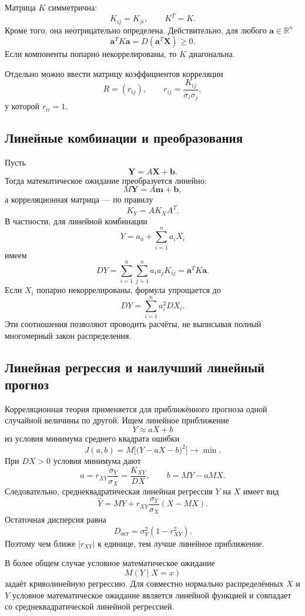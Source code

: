 Матрица $K$ симметрична:
\[
    K_{ij}=K_{ji},\qquad K^T=K.
\]
Кроме того, она неотрицательно определена. Действительно, для любого
$\mathbf a\in\mathbb R^n$
\[
    \mathbf a^T K\mathbf a
    =D(\mathbf a^T\mathbf X)\geq0.
\]
Если компоненты попарно некоррелированы, то $K$ диагональна.

Отдельно можно ввести матрицу коэффициентов корреляции
\[
    R=(r_{ij}),\qquad
    r_{ij}=\frac{K_{ij}}{\sigma_i\sigma_j},
\]
у которой $r_{ii}=1$.

\subsection{Линейные комбинации и преобразования}

Пусть
\[
    \mathbf Y=A\mathbf X+\mathbf b.
\]
Тогда математическое ожидание преобразуется линейно:
\[
    M\mathbf Y=A\mathbf m+\mathbf b,
\]
а корреляционная матрица --- по правилу
\[
    K_Y=A K_X A^T.
\]
В частности, для линейной комбинации
\[
    Y=a_0+\sum_{i=1}^n a_iX_i
\]
имеем
\[
    DY=\sum_{i=1}^n\sum_{j=1}^n a_i a_j K_{ij}
      =\mathbf a^T K\mathbf a.
\]
Если $X_i$ попарно некоррелированы, формула упрощается до
\[
    DY=\sum_{i=1}^n a_i^2 DX_i.
\]
Эти соотношения позволяют проводить расчёты, не выписывая полный многомерный
закон распределения.

\subsection{Линейная регрессия и наилучший линейный прогноз}

Корреляционная теория применяется для приближённого прогноза одной случайной
величины по другой. Ищем линейное приближение
\[
    Y\approx aX+b
\]
из условия минимума среднего квадрата ошибки
\[
    J(a,b)=M\bigl[\bigl(Y-aX-b\bigr)^2\bigr]\to\min.
\]
При $DX>0$ условия минимума дают
\[
    a=r_{XY}\frac{\sigma_Y}{\sigma_X}
      =\frac{K_{XY}}{DX},
    \qquad
    b=MY-aMX.
\]
Следовательно, среднеквадратическая линейная регрессия $Y$ на $X$ имеет вид
\[
    \widehat Y
    =MY+r_{XY}\frac{\sigma_Y}{\sigma_X}(X-MX).
\]
Остаточная дисперсия равна
\[
    D_{\text{ост}}=\sigma_Y^2(1-r_{XY}^2).
\]
Поэтому чем ближе $|r_{XY}|$ к единице, тем лучше линейное приближение.

В более общем случае условное математическое ожидание
\[
    M(Y\mid X=x)
\]
задаёт криволинейную регрессию. Для совместно нормально распределённых
$X$ и $Y$ условное математическое ожидание является линейной функцией и
совпадает со среднеквадратической линейной регрессией.

